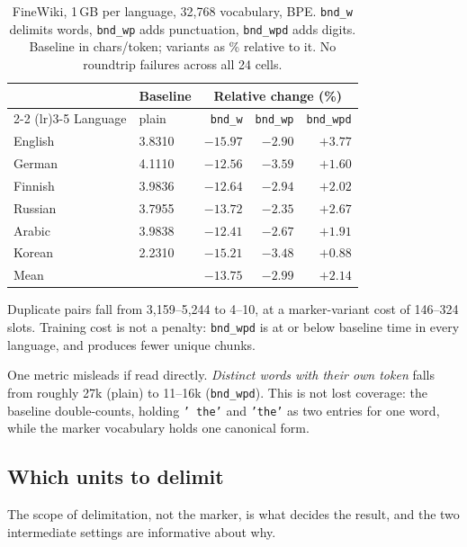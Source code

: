 \documentclass[11pt]{article}
\newcommand{\bnd}[1]{\texttt{bnd\_#1}}
\newcommand{\relchange}[1]{{\footnotesize #1}}
\begin{document}
\begin{table}[t]
\centering
\small
\begin{tabular}{llrrr}
\toprule
& \multicolumn{1}{c}{Baseline} & \multicolumn{3}{c}{Relative change (\%)} \\
\cmidrule(lr){2-2} \cmidrule(lr){3-5}
Language & plain & \bnd{w} & \bnd{wp} & \bnd{wpd} \\
\midrule
English & 3.8310 & \relchange{$-15.97$} & \relchange{$-2.90$} & $\mathbf{+3.77}$ \\
German  & 4.1110 & \relchange{$-12.56$} & \relchange{$-3.59$} & $\mathbf{+1.60}$ \\
Finnish & 3.9836 & \relchange{$-12.64$} & \relchange{$-2.94$} & $\mathbf{+2.02}$ \\
Russian & 3.7955 & \relchange{$-13.72$} & \relchange{$-2.35$} & $\mathbf{+2.67}$ \\
Arabic  & 3.9838 & \relchange{$-12.41$} & \relchange{$-2.67$} & $\mathbf{+1.91}$ \\
Korean  & 2.2310 & \relchange{$-15.21$} & \relchange{$-3.48$} & $\mathbf{+0.88}$ \\
\midrule
Mean    &        & \relchange{$-13.75$} & \relchange{$-2.99$} & $\mathbf{+2.14}$ \\
\bottomrule
\end{tabular}
\caption{FineWiki, 1\,GB per language, 32{,}768 vocabulary, BPE. \bnd{w} delimits words,
\bnd{wp} adds punctuation, \bnd{wpd} adds digits. Baseline in chars/token; variants as \%
relative to it. No roundtrip failures across all 24 cells.}
\label{tab:main}
\end{table}

Duplicate pairs fall from 3{,}159--5{,}244 to 4--10, at a marker-variant cost of 146--324
slots. Training cost is not a penalty: \bnd{wpd} is at or below baseline time in every
language, and produces fewer unique chunks.

One metric misleads if read directly. \emph{Distinct words with their own token} falls from
roughly 27k (plain) to 11--16k (\bnd{wpd}). This is not lost coverage: the baseline
double-counts, holding \texttt{' the'} and \texttt{'the'} as two entries for one word, while
the marker vocabulary holds one canonical form.

\subsection{Which units to delimit}
\label{sec:iterations}

The scope of delimitation, not the marker, is what decides the result, and the two
intermediate settings are informative about why.
\end{document}
